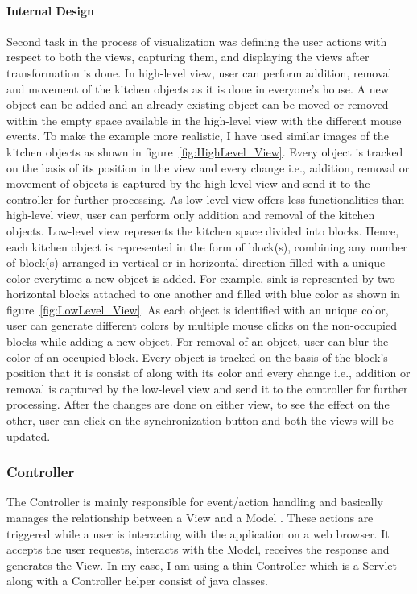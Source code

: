 \paragraph{Internal Design}
Second task in the process of visualization was defining the user actions with respect to both the views, capturing them, and displaying the views after transformation is done.
\newline\newline In high-level view, user can perform addition, removal and movement of the kitchen objects as it is done in everyone's house. A new object can be added and an already existing object can be moved or removed within the empty space available in the high-level view with the different mouse events. To make the example more realistic, I have used similar images of the kitchen objects as shown in figure~\ref{fig:HighLevel_View}. Every object is tracked on the basis of its position in the view and every change i.e., addition, removal or movement of objects is captured by the high-level view and send it to the controller for further processing.
\newline\newline As low-level view offers less functionalities than high-level view, user can perform only addition and removal of the kitchen objects. Low-level view represents the kitchen space divided into blocks. Hence, each kitchen object is represented in the form of block(s), combining any number of block(s) arranged in vertical or in horizontal direction filled with a unique color everytime a new object is added. For example, sink is represented by two horizontal blocks attached to one another and filled with {\color{blue} blue} color as shown in figure~\ref{fig:LowLevel_View}. As each object is identified with an unique color, user can generate different colors by multiple mouse clicks on the non-occupied blocks while adding a new object. For removal of an object, user can blur the color of an occupied block. Every object is tracked on the basis of the block's position that it is consist of along with its color and every change i.e., addition or removal is captured by the low-level view and send it to the controller for further processing.
\newline\newline After the changes are done on either view, to see the effect on the other, user can click on the synchronization button and both the views will be updated.
 
\subsubsection{Controller}\label{subsubsec:controller}
The Controller is mainly responsible for event/action handling and basically manages the relationship between a View and a Model \cite{mdd-webwithmvc}. These actions are triggered while a user is interacting with the application on a web browser. It accepts the user requests, interacts with
the Model, receives the response and generates the View.
\newline\newline In my case, I am using a thin Controller which is a Servlet along with a Controller helper consist of java classes.
